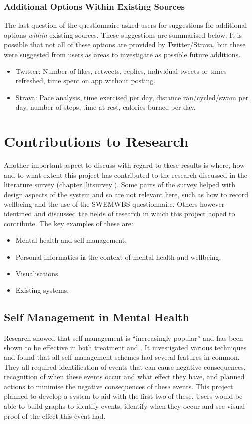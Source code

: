 \documentclass[11pt,openright,a4paper]{report}
\begin{document}
\subsubsection{Additional Options Within Existing Sources}
The last question of the questionnaire asked users for suggestions for additional options \emph{within} existing sources. These suggestions are summarised below. It is possible that not all of these options are provided by Twitter/Strava, but these were suggested from users as areas to investigate as possible future additions.
\begin{itemize}
\item Twitter: Number of likes, retweets, replies, individual tweets or times refreshed, time spent on app without posting.
\item Strava: Pace analysis, time exercised per day, distance ran/cycled/swam per day, number of steps, time at rest, calories burned per day.
\end{itemize}

\section{Contributions to Research} \label{sec:contr}
Another important aspect to discuss with regard to these results is where, how and to what extent this project has contributed to the research discussed in the literature survey (chapter \ref{litsurvey}). Some parts of the survey helped with design aspects of the system and so are not relevant here, such as how to record wellbeing and the use of the SWEMWBS questionnaire. Others however identified and discussed the fields of research in which this project hoped to contribute. The key examples of these are:
\begin{itemize}
\item Mental health and self management.
\item Personal informatics in the context of mental health and wellbeing.
\item Visualisations.
\item Existing systems.
\end{itemize}

\subsection{Self Management in Mental Health}
Research showed that self management is \enquote{increasingly popular} \parencite{selfhelpanxiety} and has been shown to be effective in both treatment \parencite{wrapstudy} and \parencite{selfmanagementrelapse}. It investigated various techniques and found that all self management schemes had several features in common. They all required identification of events that can cause negative consequences, recognition of when these events occur and what effect they have, and planned actions to minimise the negative consequences of these events. This project planned to develop a system to aid with the first two of these. Users would be able to build graphs to identify events, identify when they occur and see visual proof of the effect this event had.
\end{document}
